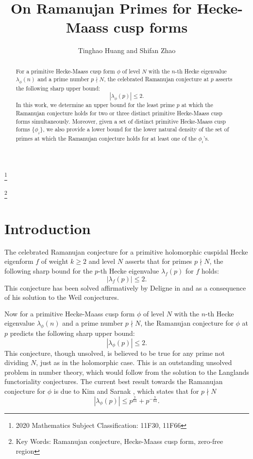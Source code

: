 \documentclass[10pt,leqno]{amsart}
\title{On Ramanujan Primes for Hecke-Maass cusp forms}
\author{Tinghao Huang and Shifan Zhao}
\theoremstyle{plain}
\theoremstyle{definition}
\theoremstyle{remark}
\numberwithin{equation}{section}
\newcommand\blfootnote[1]{%
	\begingroup
	\renewcommand\thefootnote{}\footnote{#1}%
	\addtocounter{footnote}{-1}%
	\endgroup
}
\begin{document}
\begin{abstract}
    For a primitive Hecke-Maass cusp form $\phi$ of level $N$ with the $n$-th Hecke eigenvalue $\lambda_{\phi}(n)$ and a prime number $p\nmid N$, the celebrated Ramanujan conjecture at $p$ asserts the following sharp upper bound:
\[
    |\lambda_{\phi}(p)| \leq 2.
\]
 In this work, 
 we determine an upper bound for the least prime $p$ at which the Ramanujan conjecture holds for two or three distinct primitive Hecke-Maass cusp forms simultaneously. Moreover, given a set of distinct primitive Hecke-Maass cusp forms $\{\phi_i\}$, we also provide a lower bound for the lower natural density of the set of primes at which the Ramanujan conjecture holds for at least one of the $\phi_i$'s.
\end{abstract}

\maketitle

\blfootnote{2020 Mathematics Subject Classification: 11F30, 11F66}
\blfootnote{Key Words: Ramanujan conjecture, Hecke-Maass cusp form, zero-free region}

\tableofcontents

\section{Introduction}
The celebrated Ramanujan conjecture for a primitive holomorphic cuspidal Hecke eigenform $f$ of weight $k \geq 2$ and level $N$ asserts that for primes $p \nmid N$, the following sharp bound for the $p$-th Hecke eigenvalue $\lambda_f(p)$ for $f$ holds:
\[
    |\lambda_f(p)| \leq 2.
\]
This conjecture has been solved affirmatively by Deligne in \cite{DeligneIMR340258} and \cite{DeligneIIMR3077124} as a consequence of his solution to the Weil conjectures. 

Now for a primitive Hecke-Maass cusp form $\phi$ of level $N$ with the $n$-th Hecke eigenvalue $\lambda_{\phi}(n)$ and a prime number $p\nmid N$, the Ramanujan conjecture for $\phi$ at $p$ predicts the following sharp upper bound:
\[
    |\lambda_{\phi}(p)| \leq 2.
\]
This conjecture, though unsolved, is believed to be true for any prime not dividing $N$, just as in the holomorphic case. This is an outstanding unsolved problem in number theory, which would follow from the solution to the Langlands functoriality conjectures.
The current best result towards the Ramanujan conjecture for $\phi$ is due to Kim and Sarnak \cite{Kim2003}, which states that for $p\nmid N$
\begin{equation}\label{KimSarnakboundforphi}
     |\lambda_{\phi}(p)| \leq p^{\frac{7}{64}} + p^{-\frac{7}{64}}.
\end{equation}
\end{document}
